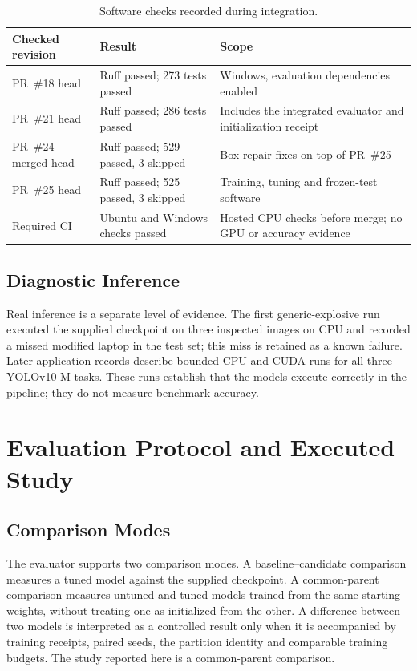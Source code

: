 \begin{table}[htbp]
\centering\tablesetup
\caption{Software checks recorded during integration.}
\label{tab:checks}
\begin{tabularx}{\textwidth}{@{}L{0.24\textwidth}L{0.24\textwidth}Y@{}}
\toprule
Checked revision & Result & Scope\\
\midrule
PR~\#18 head  & Ruff passed; 273 tests passed & Windows, evaluation
dependencies enabled\\
PR~\#21 head  & Ruff passed; 286 tests passed & Includes the
integrated evaluator and initialization receipt\\
PR~\#24 merged head  & Ruff passed; 529 passed, 3 skipped &
Box-repair fixes on top of PR~\#25\\
PR~\#25 head  & Ruff passed; 525 passed, 3 skipped & Training,
tuning and frozen-test software\\
Required CI & Ubuntu and Windows checks passed & Hosted CPU checks before merge;
no GPU or accuracy evidence\\
\bottomrule
\end{tabularx}
\end{table}

\subsection{Diagnostic Inference}
Real inference is a separate level of evidence. The first generic-explosive run
executed the supplied checkpoint on three inspected images on CPU and recorded a
missed modified laptop in the test set; this miss is retained as a known failure.
Later application records describe bounded CPU and CUDA runs for all three
YOLOv10-M tasks. These runs establish that the models execute correctly in the
pipeline; they do not measure benchmark accuracy.

\section{Evaluation Protocol and Executed Study}\label{sec:protocol}

\subsection{Comparison Modes}
The evaluator supports two comparison modes. A baseline--candidate comparison
measures a tuned model against the supplied checkpoint. A common-parent comparison
measures untuned and tuned models trained from the same starting weights, without
treating one as initialized from the other. A difference between two models is
interpreted as a controlled result only when it is accompanied by training
receipts, paired seeds, the partition identity and comparable training budgets.
The study reported here is a common-parent comparison.

